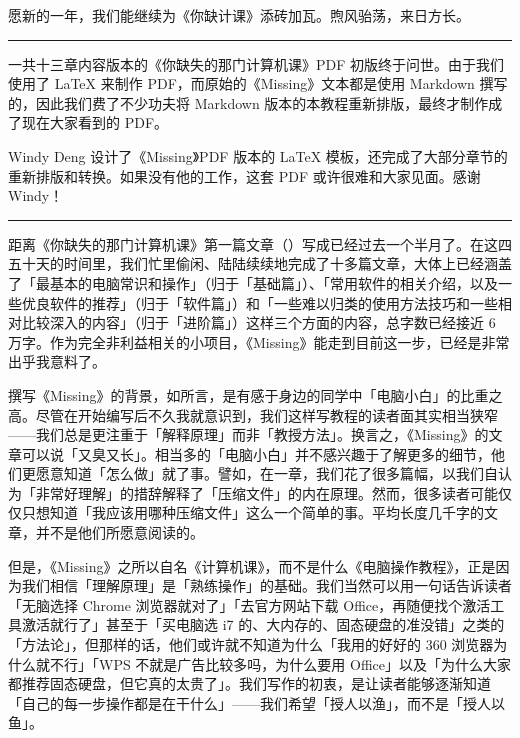 愿新的一年，我们能继续为《你缺计课》添砖加瓦。煦风骀荡，来日方长。


\begin{center}\rule{0.5\linewidth}{0.5pt}\end{center}

一共十三章内容版本的《你缺失的那门计算机课》PDF 初版终于问世。由于我们使用了 \LaTeX{} 来制作 PDF，而原始的《Missing》文本都是使用 Markdown 撰写的，因此我们费了不少功夫将 Markdown 版本的本教程重新排版，最终才制作成了现在大家看到的 PDF。

Windy Deng 设计了《Missing》PDF 版本的 \LaTeX{} 模板，还完成了大部分章节的重新排版和转换。如果没有他的工作，这套 PDF 或许很难和大家见面。感谢 Windy！


\begin{center}\rule{0.5\linewidth}{0.5pt}\end{center}

距离《你缺失的那门计算机课》第一篇文章（）写成已经过去一个半月了。在这四五十天的时间里，我们忙里偷闲、陆陆续续地完成了十多篇文章，大体上已经涵盖了「最基本的电脑常识和操作」（归于「基础篇」）、「常用软件的相关介绍，以及一些优良软件的推荐」（归于「软件篇」）和「一些难以归类的使用方法技巧和一些相对比较深入的内容」（归于「进阶篇」）这样三个方面的内容，总字数已经接近 6 万字。作为完全非利益相关的小项目，《Missing》能走到目前这一步，已经是非常出乎我意料了。

撰写《Missing》的背景，如所言，是有感于身边的同学中「电脑小白」的比重之高。尽管在开始编写后不久我就意识到，我们这样写教程的读者面其实相当狭窄——我们总是更注重于「解释原理」而非「教授方法」。换言之，《Missing》的文章可以说「又臭又长」。相当多的「电脑小白」并不感兴趣于了解更多的细节，他们更愿意知道「怎么做」就了事。譬如，在一章，我们花了很多篇幅，以我们自认为「非常好理解」的措辞解释了「压缩文件」的内在原理。然而，很多读者可能仅仅只想知道「我应该用哪种压缩文件」这么一个简单的事。平均长度几千字的文章，并不是他们所愿意阅读的。

但是，《Missing》之所以自名《计算机课》，而不是什么《电脑操作教程》，正是因为我们相信「理解原理」是「熟练操作」的基础。我们当然可以用一句话告诉读者「无脑选择 Chrome 浏览器就对了」「去官方网站下载 Office，再随便找个激活工具激活就行了」甚至于「买电脑选 i7 的、大内存的、固态硬盘的准没错」之类的「方法论」，但那样的话，他们或许就不知道为什么「我用的好好的 360 浏览器为什么就不行」「WPS 不就是广告比较多吗，为什么要用 Office」以及「为什么大家都推荐固态硬盘，但它真的太贵了」。我们写作的初衷，是让读者能够逐渐知道「自己的每一步操作都是在干什么」——我们希望「授人以渔」，而不是「授人以鱼」。

